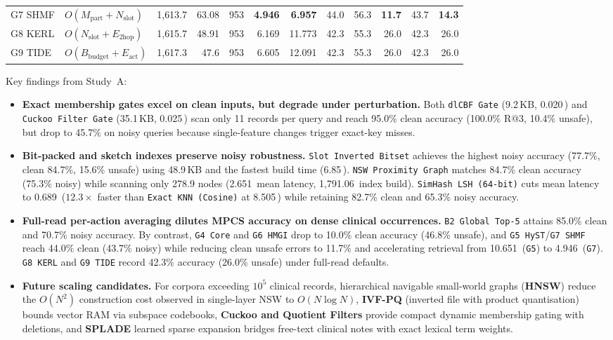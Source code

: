 \documentclass[12pt,a4paper,oneside]{report}
\newcommand{\code}[1]{\texttt{\small #1}}
\newcommand{\ms}{\,\text{ms}}
\begin{document}
\begin{table}[H]
\begin{tabular}{@{}ll rrr rr rrr rr@{}}
G7 SHMF & $O(M_{\text{part}}{+}N_{\text{slot}})$ & 1{,}613.7 & 63.08 & 953 & \textbf{4.946} & \textbf{6.957} & 44.0 & 56.3 & \textbf{11.7} & 43.7 & \textbf{14.3}\\
G8 KERL & $O(N_{\text{slot}}{+}E_{\text{2hop}})$ & 1{,}615.7 & 48.91 & 953 & 6.169 & 11.773 & 42.3 & 55.3 & 26.0 & 42.3 & 26.0\\
G9 TIDE & $O(B_{\text{budget}}{+}E_{\text{act}})$ & 1{,}617.3 & 47.6 & 953 & 6.605 & 12.091 & 42.3 & 55.3 & 26.0 & 42.3 & 26.0\\
\bottomrule
\end{tabular}
\end{table}

\noindent Key findings from Study~A:
\begin{itemize}
  \item \textbf{Exact membership gates excel on clean inputs, but degrade under perturbation.} Both \code{dlCBF Gate} (9.2\,KB, 0.020\ms{}) and \code{Cuckoo Filter Gate} (35.1\,KB, 0.025\ms{}) scan only 11 records per query and reach 95.0\% clean accuracy (100.0\% R@3, 10.4\% unsafe), but drop to 45.7\% on noisy queries because single-feature changes trigger exact-key misses.
  \item \textbf{Bit-packed and sketch indexes preserve noisy robustness.} \code{Slot Inverted Bitset} achieves the highest noisy accuracy (77.7\%, clean 84.7\%, 15.6\% unsafe) using 48.9\,KB and the fastest build time (6.85\ms{}). \code{NSW Proximity Graph} matches 84.7\% clean accuracy (75.3\% noisy) while scanning only 278.9 nodes (2.651\ms{} mean latency, 1{,}791.06\ms{} index build). \code{SimHash LSH (64-bit)} cuts mean latency to 0.689\ms{} ($12.3\times$ faster than \code{Exact KNN (Cosine)} at 8.505\ms{}) while retaining 82.7\% clean and 65.3\% noisy accuracy.
  \item \textbf{Full-read per-action averaging dilutes MPCS accuracy on dense clinical occurrences.} \code{B2 Global Top-5} attains 85.0\% clean and 70.7\% noisy accuracy. By contrast, \code{G4 Core} and \code{G6 HMGI} drop to 10.0\% clean accuracy (46.8\% unsafe), and \code{G5 HyST}/\code{G7 SHMF} reach 44.0\% clean (43.7\% noisy) while reducing clean unsafe errors to 11.7\% and accelerating retrieval from 10.651\ms{} (\code{G5}) to 4.946\ms{} (\code{G7}). \code{G8 KERL} and \code{G9 TIDE} record 42.3\% accuracy (26.0\% unsafe) under full-read defaults.
  \item \textbf{Future scaling candidates.} For corpora exceeding $10^5$ clinical records, hierarchical navigable small-world graphs (\textbf{HNSW}) reduce the $O(N^2)$ construction cost observed in single-layer NSW to $O(N \log N)$, \textbf{IVF-PQ} (inverted file with product quantisation) bounds vector RAM via subspace codebooks, \textbf{Cuckoo and Quotient Filters} provide compact dynamic membership gating with deletions, and \textbf{SPLADE} learned sparse expansion bridges free-text clinical notes with exact lexical term weights.
\end{itemize}
\end{document}
